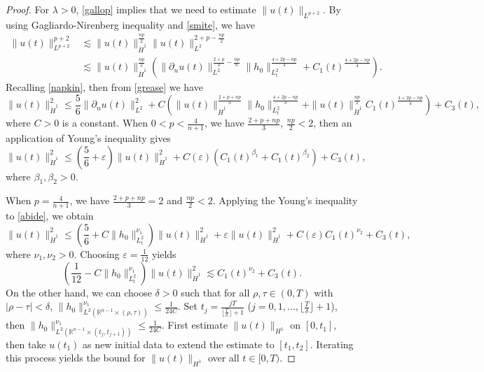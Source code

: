 \documentclass[preprint,compress,12pt]{elsarticle}
\numberwithin{equation}{section}
\begin{document}
\begin{proof}
	For $\lambda>0$, \eqref{gallop} implies that we need to estimate $\|u(t)\|_{L^{p+2}}$. By using Gagliardo-Nirenberg inequality and \eqref{smite}, we have
	\begin{equation}\label{grease}
		\begin{aligned}
			\|u(t)\|_{L^{p+2}}^{p+2}&\lesssim \|u(t)\|_{\dot{H}^{1}}^{\frac{np}{2}} \|u(t)\|_{L^{2}}^{2+p-\frac{np}{2}}\\
			&\lesssim \|u(t)\|_{\dot{H}^{1}}^{\frac{np}{2}} \left(\|\partial_{n}u(t)\|_{L^2}^{\frac{2+p}{3}-\frac{np}{6}}\|h_{0}\|_{L^2_t}^{\frac{4+2p-np}{3}}+C_{1}(t)^{\frac{4+2p-np}{4}}\right).
		\end{aligned}
	\end{equation}
	Recalling \eqref{napkin}, then from \eqref{grease} we have
	\begin{equation}\label{abide}
		\|u(t)\|_{\dot{H}^{1}}^{2}\leq \frac{5}{6}\|\partial_{n}u(t)\|_{L^2}^{2}+ C\left(\|u(t)\|_{\dot{H}^{1}}^{\frac{2+p+np}{3}}\|h_{0}\|_{L^{2}_{t}}^{\frac{4+2p-np}{3}}+\|u(t)\|_{\dot{H}^{1}}^{\frac{np}{2}}C_{1}(t)^{\frac{4+2p-np}{4}}\right)+C_{3}(t),
	\end{equation}
	where $C>0$ is a constant.		When $0<p<\frac{4}{n+1}$, we have $\frac{2+p+np}{3}$, $\frac{np}{2}<2$, then an application of Young's inequality gives
	\begin{equation}
		\|u(t)\|_{\dot{H}^{1}}^{2}\leq \left(\frac{5}{6}+\varepsilon\right)\|u(t)\|_{\dot{H}^{1}}^{2}+C({\varepsilon}) \left(C_{1}(t)^{\beta_{1}}+C_{1}(t)^{\beta_{2}}\right) +C_{3}(t),
	\end{equation}
	where $\beta_{1},\beta_{2}>0$.	
	
	When $p=\frac{4}{n+1}$, we have $\frac{2+p+np}{3}=2$ and $\frac{np}{2}<2$. Applying the Young's inequality to \eqref{abide}, we obtain
	\begin{equation*}
		\|u(t)\|_{\dot{H}^{1}}^{2}\leq \left(\frac{5}{6}+C \|h_{0}\|_{L^{2}_{t}}^{\nu_{1}}\right)   \|u(t)\|_{\dot{H}^{1}}^{2}+\varepsilon\|u(t)\|_{\dot{H}^{1}}^{2} + C(\varepsilon) C_{1}(t)^{\nu_{2}} +C_{3}(t),
	\end{equation*}
	where $\nu_{1},\nu_{2}>0$. Choosing $\varepsilon = \frac{1}{12}$ yields
	\begin{equation*}	\left(\frac{1}{12}-C\|h_{0}\|_{L^{2}_{t}}^{\nu_{1}}\right)\|u(t)\|_{\dot{H}^{1}}^{2}\lesssim C_{1}(t)^{\nu_{2}}+C_{3}(t).
	\end{equation*}
	On the other hand, we can choose $\delta>0$ such that for all $\rho, \tau \in (0,T)$ with $|\rho-\tau|<\delta$,  $\|h_{0}\|^{\nu_{1}}_{L^{2}(\mathbb{R}^{n-1}\times(\rho,\tau))}\leq \tfrac{1}{24C}$. Set $t_{j}=\frac{jT}{\lfloor\frac{T}{\delta}\rfloor+1}$ ($j=0, 1, \dots , \lfloor\frac{T}{\delta}\rfloor+1$), then $\|h_{0}\|^{\nu_{1}}_{L^{2}(\mathbb{R}^{n-1}\times(t_{j},t_{j+1}))}\leq \frac{1}{24C}$.  First estimate $\|u(t)\|_{H^{1}}$ on $[0,t_{1}]$, then take $u(t_{1})$ as new initial data to extend the estimate to $[t_{1},t_{2}]$. Iterating this process yields the bound for $\|u(t)\|_{H^{1}}$ over all $t \in [0,T)$.
\end{proof}
\end{document}
